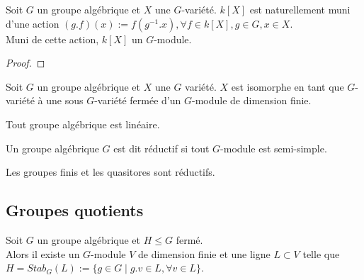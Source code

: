 \begin{prop}
Soit $G$ un groupe algébrique et $X$ une $G$-variété. $k[X]$ est naturellement muni d'une action $(g.f)(x):=f(g^{-1}.x), \forall f\in k[X], g\in G,x\in X$.\\
Muni de cette action, $k[X]$ un $G$-module.
\end{prop}
\begin{proof}

\end{proof}

\begin{thm}
Soit $G$ un groupe algébrique et $X$ une $G$ variété. $X$ est isomorphe en tant que $G$-variété à une sous $G$-variété fermée d'un $G$-module de dimension finie.
\end{thm}

\begin{cor}
Tout groupe algébrique est linéaire.
\end{cor}

\begin{defn}
Un groupe algébrique $G$ est dit réductif si tout $G$-module est semi-simple.
\end{defn}

\begin{ex}
Les groupes finis et les quasitores sont réductifs.
\end{ex}

\subsection{Groupes quotients}
\begin{thm}
Soit $G$ un groupe algébrique et $H\leq G$ fermé. \\Alors il existe un $G$-module $V$ de dimension finie et une ligne $L\subset V$ telle que $H=Stab_G(L):=\lbrace g\in G\mid g.v\in L,\forall v\in L\rbrace$.
\end{thm}

